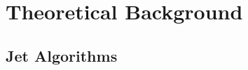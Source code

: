 \chapter{Theoretical Background}
\label{chap:Theory}
\section{Jet Algorithms}
\label{sec:jet_algos}
\begin{comment}
Predictions at NLO accuracy in pQCD are computed with the \NLOJETPP
program version~4.1.3~\cite{Nagy:2001fj,Nagy:2003tz}. The results are
provided within the framework of \fastNLO
version~2.3~\cite{Britzger:2012bs} for use within fits. The
renormalization and factorization scales \mur and \muf are chosen
equal to \httwo. PDF sets at NLO available for a series of different
assumptions on \alpsmz via the \LHAPDFS package~\cite{Buckley:2014ana}
are listed in Table~\ref{tab:chap2:nlopdfsets}. All sets employ a
variable-flavour number scheme with at most five or six flavours apart
from the ABM11 PDFs, which use a fixed-flavour number scheme with
$\NF=5$.

Out of these eight PDF sets the following three will not be considered
further:
%
\begin{itemize}
\item At NLO, predictions based on ABM11 do not describe LHC jet data
  at small jet rapidity, cf.\ Refs.~\cite{Aad:2013lpa, Aad:2014vwa,
    CMS:2014mna, Khachatryan:2015luy}.
\item The HERAPDF2.0 set exclusively fits HERA DIS data with only weak
  constraints on the gluon PDF\@.
\item The range in values available for \alpsmz is too limited for the
  NNPDF3.0 set.
\end{itemize}
%

PDF uncertainties are evaluated according to the prescriptions given
for each PDF set. Uncertainties on \alpsmz are not considered, since
this value is later on determined from a fit to the data. The PDF
uncertainty as derived with the CT10 PDF set ranges from 2\% to 30\%
for inclusive 2- and 3-jet cross sections and from 2\% to 7\% for \ratio.


\end{comment}
